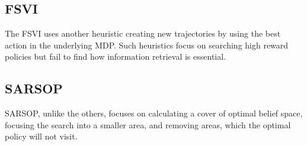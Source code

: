 \subsection{FSVI \cite{fsvi}}
The FSVI uses another heuristic creating new trajectories by using the best action in the underlying MDP. Such heuristics focus on searching high reward policies but fail to find how information retrieval is essential.


\subsection{SARSOP \cite{sarsop}}
SARSOP, unlike the others, focuses on calculating a cover of optimal belief space, focusing the search into a smaller area, and removing areas, which the optimal policy will not visit.


